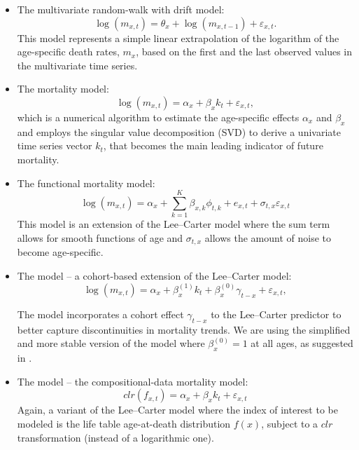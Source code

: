 \documentclass[T0_MEM]{subfiles}
\begin{document}
\begin{itemize}
  \item The multivariate random-walk with drift model:\\
  \begin{equation}
  \log(m_{x,t}) = \theta_x + \log(m_{x, t-1}) + \varepsilon_{x,t}.
  \end{equation}
  This model represents a simple linear extrapolation of the logarithm of the age-specific death rates, $m_x$, based on the first and the last observed values in the multivariate time series.

  \item The \cite{lee1992} mortality model: \\
  \begin{equation}
  \log(m_{x, t}) = \alpha_x + \beta_x k_t + \varepsilon_{x,t},
  \end{equation}
  which is a numerical algorithm to estimate the age-specific effects $\alpha_x$ and $\beta_x$ and employs the singular value decomposition (SVD) to derive a univariate time series vector $k_t$, that becomes the main leading indicator of future mortality.

  \item The \cite{hyndman2007} functional mortality model: \\
  \begin{equation}
  \log(m_{x, t}) = \alpha_x + \sum_{k=1}^{K} \beta_{x,k} \phi_{t,k} + e_{x,t} + \sigma_{t, x} \varepsilon_{x,t}
  \end{equation}
  This model is an extension of the Lee--Carter model where the sum term allows for smooth functions of age and $\sigma_{t, x}$ allows the amount of noise to become age-specific.

  \item The \cite{renshaw2006} model -- a cohort-based extension of the Lee--Carter model: \\
  \begin{equation}
  \log(m_{x, t}) = \alpha_x + \beta^{(1)}_{x} k_t + \beta^{(0)}_{x} \gamma_{t-x} + \varepsilon_{x,t},
  \end{equation}

The model incorporates a cohort effect $\gamma_{t-x}$ to the Lee--Carter predictor to better capture discontinuities in mortality trends. We are using the simplified and more stable version of the model where $\beta^{(0)}_{x} = 1$ at all ages, as suggested in \cite{haberman2011}.

  \item The \cite{oeppen2008} model -- the compositional-data mortality model:\\
  \begin{equation}
  clr(f_{x, t}) = \alpha_x + \beta_x k_t + \varepsilon_{x,t}
  \end{equation}
  Again, a variant of the Lee--Carter model where the index of interest to be modeled is the life table age-at-death distribution $f(x)$, subject to a $clr$ transformation (instead of a logarithmic one).


\end{itemize}
\end{document}
